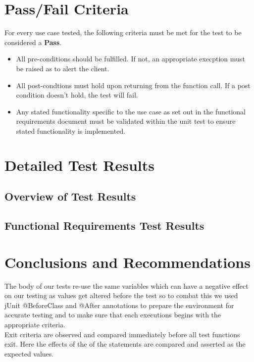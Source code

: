 \documentclass[english]{article}
\begin{document}
			
		   \section{Pass/Fail Criteria}
		   For every use case tested, the following criteria must be met for the test to be
		   considered a \textbf{Pass}.
		   \begin{itemize}
		   	\item All pre-conditions should be fulfilled. If not, an appropriate execption
		   	must be raised as to alert the client.
		   	\item All post-condtions must hold upon returning from the function call. If 
		   	a post condition doesn't hold, the test will fail.
		   	\item Any stated functionality specific to the use case as set out in the
		   	functional requirements document must be validated within the unit test to
		   	ensure stated functionality is implemented.
		   \end{itemize}
	
		\newpage

		\section{Detailed Test Results}
		\subsection{Overview of Test Results}
		\subsection{Functional Requirements Test Results}

		\section{Conclusions and Recommendations}
		The body of our tests re-use the same variables which can have a negative effect on our testing as values get altered before the test so to combat this we used jUnit @BeforeClass and @After annotations to prepare the environment for accurate testing and to make sure that each executions begins with the appropriate criteria.
		\\[4pt]
		Exit criteria are observed and compared immediately before all test functions exit. Here the effects of the of the statements are compared and asserted as the expected values.
		
\end{document}
